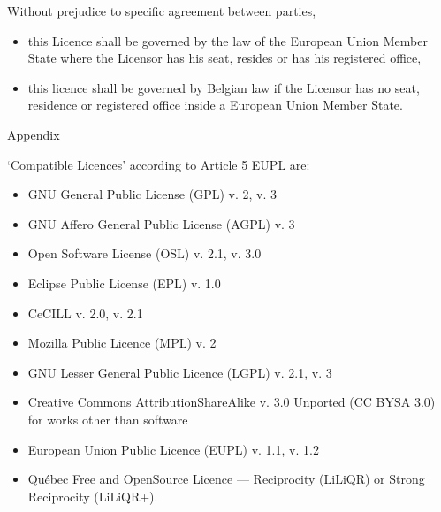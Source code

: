 \documentclass[letterpaper,10pt,english]{sphinxmanual}
\begin{document}
\sphinxAtStartPar
Without prejudice to specific agreement between parties,
\begin{itemize}
\item {} 
\sphinxAtStartPar
this Licence shall be governed by the law of the European Union Member State
where the Licensor has his seat, resides or has his registered office,

\item {} 
\sphinxAtStartPar
this licence shall be governed by Belgian law if the Licensor has no seat,
residence or registered office inside a European Union Member State.

\end{itemize}

\sphinxAtStartPar
Appendix

\sphinxAtStartPar
‘Compatible Licences’ according to Article 5 EUPL are:
\begin{itemize}
\item {} 
\sphinxAtStartPar
GNU General Public License (GPL) v. 2, v. 3

\item {} 
\sphinxAtStartPar
GNU Affero General Public License (AGPL) v. 3

\item {} 
\sphinxAtStartPar
Open Software License (OSL) v. 2.1, v. 3.0

\item {} 
\sphinxAtStartPar
Eclipse Public License (EPL) v. 1.0

\item {} 
\sphinxAtStartPar
CeCILL v. 2.0, v. 2.1

\item {} 
\sphinxAtStartPar
Mozilla Public Licence (MPL) v. 2

\item {} 
\sphinxAtStartPar
GNU Lesser General Public Licence (LGPL) v. 2.1, v. 3

\item {} 
\sphinxAtStartPar
Creative Commons Attribution\sphinxhyphen{}ShareAlike v. 3.0 Unported (CC BY\sphinxhyphen{}SA 3.0) for
works other than software

\item {} 
\sphinxAtStartPar
European Union Public Licence (EUPL) v. 1.1, v. 1.2

\item {} 
\sphinxAtStartPar
Québec Free and Open\sphinxhyphen{}Source Licence — Reciprocity (LiLiQ\sphinxhyphen{}R) or Strong
Reciprocity (LiLiQ\sphinxhyphen{}R+).

\end{itemize}
\end{document}
